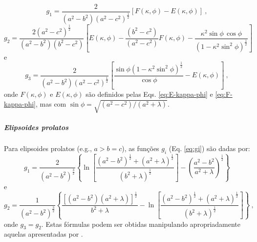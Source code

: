 \begin{equation}
g_{1} = \frac{2}{\left( a^{2} - b^{2} \right) \left( a^{2} - c^{2} \right)^{\frac{1}{2}}}
\left[ F(\kappa, \phi) - E(\kappa, \phi) \right] \: ,
\label{eq:g1-triaxial}
\end{equation}
\begin{equation}
g_{2} = \frac{2 \left( a^{2} - c^{2} \right)^{\frac{1}{2}}}
{\left( a^{2} - b^{2} \right)\left( b^{2} - c^{2} \right)}
\left[ E\left(\kappa, \phi \right) 
- \frac{\left( b^{2} - c^{2} \right)}{\left( a^{2} - c^{2} \right)}
F\left(\kappa, \phi \right) 
- \frac{\kappa^{2} \sin\phi \, \cos\phi}
{\left( 1 - \kappa^{2} \sin^{2}\phi \right)^{\frac{1}{2}}}
\right]
\label{eq:g2-triaxial}
\end{equation}
e
\begin{equation}
g_{3} = \frac{2}{\left( a^{2} - b^{2} \right) \left( a^{2} - c^{2} \right)^{\frac{1}{2}}}
\left[ \frac{\sin\phi \left( 1 - \kappa^{2} \sin^{2}\phi \right)^{\frac{1}{2}}}
{\cos\phi}  - E\left(\kappa, \phi \right) \right]
\: ,
\label{eq:g3-triaxial}
\end{equation}
onde $F(\kappa, \phi)$ e $E(\kappa, \phi)$ são definidos pelas
Eqs. \ref{eq:E-kappa-phi} e \ref{eq:F-kappa-phi},
mas com
$\sin \phi = \sqrt{\left( a^{2} - c^{2} \right)/\left( a^{2} + \lambda \right)}$.

\subparagraph*{Elipsoides prolatos}


Para elipsoides prolatos (e.g., $a > b = c$), as funções
$g_{i}$ (Eq. \ref{eq:gi}) são dadas por:
\begin{equation}
g_{1} =  \frac{2}{\left( a^{2} - b^{2} \right)^{\frac{3}{2}}}
\left\lbrace
\ln \left[ \frac{\left( a^{2} - b^{2} \right)^{\frac{1}{2}} + 
	\left( a^{2} + \lambda \right)^{\frac{1}{2}}}{
	\left( b^{2} + \lambda \right)^{\frac{1}{2}}} \right] -
\left( \frac{a^{2} - b^{2}}{a^{2} + \lambda} \right)^{\frac{1}{2}}
\right\rbrace
\label{eq:g1-prolate}
\end{equation}
e
\begin{equation}
g_{2} =  \frac{1}{\left( a^{2} - b^{2} \right)^{\frac{3}{2}}}
\left\lbrace
\frac{\left[ \left( a^{2} - b^{2} \right)
	\left( a^{2} + \lambda \right) \right]^{\frac{1}{2}}}
{b^{2} + \lambda} -
\ln \left[ \frac{\left( a^{2} - b^{2} \right)^{\frac{1}{2}} + 
	\left( a^{2} + \lambda \right)^{\frac{1}{2}}}{
	\left( b^{2} + \lambda \right)^{\frac{1}{2}}} \right]
\right\rbrace \: ,
\label{eq:g2-prolate}
\end{equation}
onde $g_{3} = g_{2}$.
Estas fórmulas podem ser obtidas manipulando apropriadamente aquelas
apresentadas por \cite{emerson1985}.


